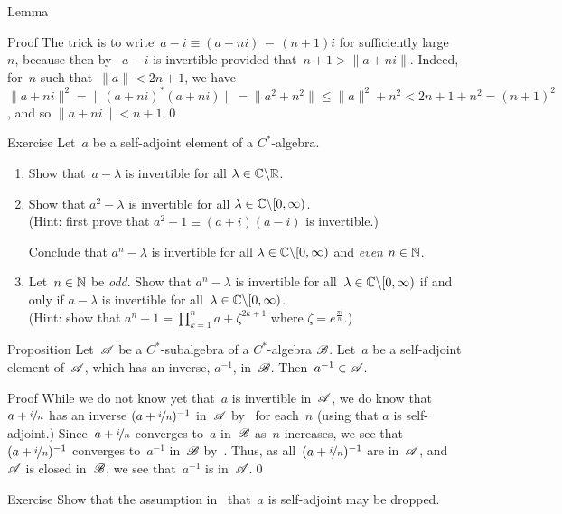 \documentclass[a]{subfiles}
\begin{document}
\begin{parsec}
\begin{point}{Lemma}
\begin{point}{Proof}
The trick
is to 
write~$a-i\equiv (a+ni)\,-\,(n+1)i$
for sufficiently large~$n$,
because  
then
by~
$a-i$
is invertible provided that~$n+1 > \|a+ni\|$.
Indeed, for~$n$ such that~$\|a\|<2n+1$,
we have $\|a+ni\|^2 = \|(a+ni)^*(a+ni)\|
= \|a^2+n^2\|
\leq \|a\|^2+n^2 < 2n+1+n^2 = (n+1)^2$,
and so $\|a+ni\| < n+1$.\qed
\end{point}
\end{point}
\begin{point}{Exercise}%
Let~$a$ be a self-adjoint element of a $C^*$-algebra.
\begin{enumerate}
\item
Show that~$a-\lambda$ is invertible for all $\lambda\in \mathbb{C}\backslash \mathbb{R}$.
\item
Show that $a^2-\lambda$ is invertible for all 
$\lambda\in \mathbb{C}\backslash[0,\infty)$.\\
(Hint: first prove that
 $a^2+1 \equiv (a+i)(a-i)$ is invertible.)

Conclude that $a^n-\lambda$ is invertible for all 
$\lambda\in\mathbb{C}\backslash[0,\infty)$ and \emph{even} $n\in\mathbb{N}$.
\item
Let~$n\in \mathbb{N}$ be \emph{odd}.
Show that $a^n-\lambda$ is invertible
for all~$\lambda\in \mathbb{C}\backslash[0,\infty)$
if and only if $a-\lambda$ is invertible
for all~$\lambda\in \mathbb{C}\backslash[0,\infty)$.\\
(Hint: show that
$a^n+1= \prod_{k=1}^n a+\zeta^{2k+1}$
where $\zeta=e^{\frac{\pi i}{n}}$.)
\end{enumerate}
\end{point}
\begin{point}{Proposition}%
Let~$\mathscr{A}$ be a $C^*$-subalgebra
of a $C^*$-algebra $\mathscr{B}$.
Let~$a$ be a self-adjoint element of~$\mathscr{A}$,
which has an inverse, $a^{-1}$, in~$\mathscr{B}$.
Then~$a^{-1}\in\mathscr{A}$.
\begin{point}{Proof}%
While we do not know yet that~$a$ is invertible in~$\mathscr{A}$,
we do know that~$a+\nicefrac{i}{n}$ 
has an inverse $(a+\nicefrac{i}{n})^{-1}$ in~$\mathscr{A}$
by~
for each~$n$
(using that $a$ is self-adjoint.)
Since~$a+\nicefrac{i}{n}$ converges to~$a$ in~$\mathscr{B}$ as~$n$ increases,
we see that $(a+\nicefrac{i}{n})^{-1}$ converges to~$a^{-1}$
in~$\mathscr{B}$ by~.
Thus, as all~$(a+\nicefrac{i}{n})^{-1}$ are in~$\mathscr{A}$,
and~$\mathscr{A}$ is closed in~$\mathscr{B}$,
we see that~$a^{-1}$ is in~$\mathscr{A}$.\qed
\end{point}
\end{point}
\begin{point}{Exercise}%
	Show that the assumption in~ 
	that~$a$ is self-adjoint
may be dropped. 


\end{point}
\end{parsec}
\end{document}
